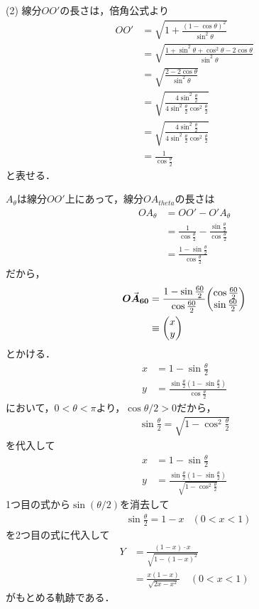 \documentclass[a4paper,10pt]{ltjsarticle}
\begin{document}
\begin{multicols}{2}
(2) 
線分$OO'$の長さは，倍角公式より
\begin{align*}
    OO' 
    &= \sqrt{1+\frac{(1-\cos\theta)^2}{\sin^2\theta}} \\
    &= \sqrt{\frac{1+\sin^2\theta + \cos^2\theta -2\cos\theta}{\sin^2\theta}} \\
    &= \sqrt{\frac{2 -2\cos\theta}{\sin^2\theta}} \\
    &= \sqrt{\frac{4\sin^2\frac{\theta}{2}}{4\sin^2\frac{\theta}{2}\cos^2\frac{\theta}{2}}} \\
    &= \sqrt{\frac{4\sin^2\frac{\theta}{2}}{4\sin^2\frac{\theta}{2}\cos^2\frac{\theta}{2}}} \\
    &= \frac{1}{\cos\frac{\theta}{2}}
\end{align*}
と表せる．

$A_{\theta}$は線分$OO'$上にあって，線分$OA_{theta}$の長さは
\begin{align*}
    OA_{\theta} 
    &= OO' - O'A_{\theta} \\
    &= \frac{1}{\cos\frac{\theta}{2}} -  \frac{\sin\frac{\theta}{2}}{\cos\frac{\theta}{2}} \\
    &= \frac{1-\sin\frac{\theta}{2}}{\cos\frac{\theta}{2}}
\end{align*}
だから，
\begin{align*}
    \va*{OA_{\theta}} 
    &=  \frac{1-\sin\frac{\theta}{2}}{\cos\frac{\theta}{2}} \mqty(\cos\frac{\theta}{2}\\ \sin\frac{\theta}{2}) \\
    &\equiv \mqty(x\\ y)
\end{align*}
とかける．
\begin{align}
    x &= 1-\sin\frac{\theta}{2} \\
    y &= \frac{\sin\frac{\theta}{2}\left(1-\sin\frac{\theta}{2}\right)}{\cos\frac{\theta}{2}}
\end{align}
において，$0<\theta<\pi$より，$\cos\theta/2>0$だから，
\begin{align}
    \sin\frac{\theta}{2} = \sqrt{1-\cos^2\frac{\theta}{2}}
\end{align}
を代入して
\begin{align}
    x &= 1-\sin\frac{\theta}{2} \\
    y &= \frac{\sin\frac{\theta}{2}\left(1-\sin\frac{\theta}{2}\right)}{\sqrt{1-\cos^2\frac{\theta}{2}}}
\end{align}
1つ目の式から$\sin(\theta/2)$を消去して
\begin{align*}
    &\sin\frac{\theta}{2} = 1-x & (0<x<1)
\end{align*}
を2つ目の式に代入して
\begin{align*}
    Y 
    &= \frac{(1-x)\cdot x}{\sqrt{1-(1-x)^2}} \\
    &= \frac{x(1-x)}{\sqrt{2x-x^2}} \quad (0<x<1)
\end{align*}
がもとめる軌跡である．


\end{multicols}
\end{document}
